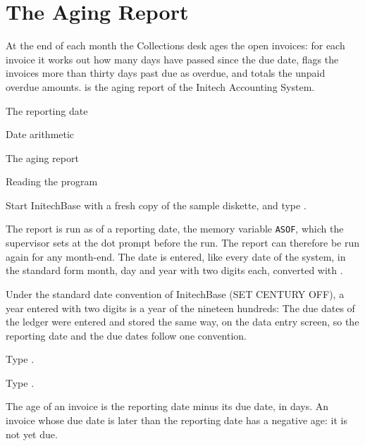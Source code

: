 \chapter{The Aging Report}
At the end of each month the Collections desk ages the open invoices: for each
invoice it works out how many days have passed since the due date, flags the
invoices more than thirty days past due as overdue, and totals the unpaid
overdue amounts.   is the aging report of the Initech
Accounting System.

\begin{ChapterCovers}
\item The reporting date
\item Date arithmetic
\item The aging report
\item Reading the program
\end{ChapterCovers}

Start InitechBase with a fresh copy of the sample diskette, and type
.

The report is run as of a reporting date, the memory variable \texttt{ASOF},
which the supervisor sets at the dot prompt before the run.  The report can
therefore be run again for any month-end.  The date is entered, like every date
of the system, in the standard form month, day and year with two digits each,
converted with .

Under the standard date convention of InitechBase (SET CENTURY OFF), a year
entered with two digits is a year of the nineteen hundreds:
The due dates of the ledger were entered and stored the same way, on the data
entry screen, so the reporting date and the due dates follow one convention.

\begin{Steps}
\item Type .
\item Type .
\end{Steps}
The age of an invoice is the reporting date minus its due date,
in days.  An invoice whose due date is later than the reporting date has a
negative age: it is not yet due.

